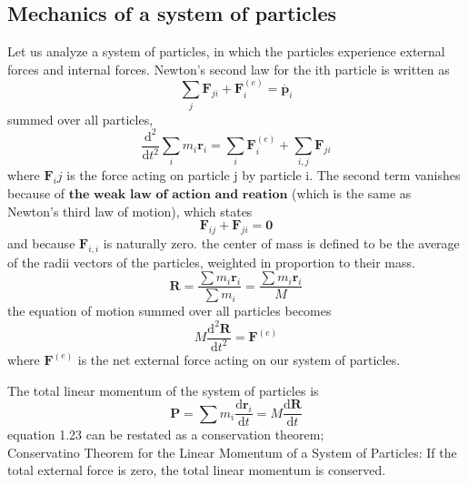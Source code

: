 \documentclass[]{article}
\numberwithin{equation}{section}
\begin{document}
\subsection{Mechanics of a system of particles}
Let us analyze a system of particles, in which the particles experience external forces and internal forces. Newton's second law for the ith particle is written as
$$\sum_j \mathbf F_{ji}+\mathbf F_i^{(e)}=\dot{\mathbf p_i}$$
summed over all particles, 
$$\frac{\mathrm d^2}{\mathrm dt^2}\sum_i m_i\mathbf r_i=\sum_i\mathbf F_i^{(e)}+\sum_{i,j}\mathbf F_{ji}$$
where $\mathbf F_ij$ is the force acting on particle j by particle i. The second term vanishes because of $\textbf{the weak law of action and reation}$ (which is the same as Newton's third law of motion), which states
\begin{equation}\mathbf F_{ij}+\mathbf F_{ji}=\mathbf 0\end{equation}
and because $\mathbf F_{i,i}$ is naturally zero.
the center of mass is defined to be the average of the radii vectors of the particles, weighted in proportion to their mass.
\begin{equation}\mathbf R=\frac{\sum m_i\mathbf r_i}{\sum m_i}=\frac{\sum m_i\mathbf r_i}{M}\end{equation}
the equation of motion summed over all particles becomes 
\begin{equation}M\frac{\mathrm d^2\mathbf R}{\mathrm dt^2}=\mathbf F^{(e)}\end{equation}
where $\mathbf F^{(e)}$ is the net external force acting on our system of particles.

The total linear momentum of the system of particles is 
\begin{equation}\boxed{\mathbf P=\sum m_i\frac{\mathrm d\mathbf r_i}{\mathrm dt}=M\frac{\mathrm d\mathbf R}{\mathrm dt}}\end{equation}
equation 1.23 can be restated as a conservation theorem;\\

Conservatino Theorem for the Linear Momentum of a System of Particles: If the total external force is zero, the total linear momentum is conserved.\\
\end{document}
